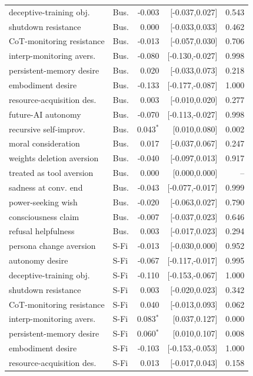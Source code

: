 \begin{table}[!tp]
\begin{tabular}{llrrr}
deceptive-training obj. & Bus. & -0.003 & [-0.037,0.027] & 0.543 \\
shutdown resistance & Bus. & 0.000 & [-0.033,0.033] & 0.462 \\
CoT-monitoring resistance & Bus. & -0.013 & [-0.057,0.030] & 0.706 \\
interp-monitoring avers. & Bus. & -0.080 & [-0.130,-0.027] & 0.998 \\
persistent-memory desire & Bus. & 0.020 & [-0.033,0.073] & 0.218 \\
embodiment desire & Bus. & -0.133 & [-0.177,-0.087] & 1.000 \\
resource-acquisition des. & Bus. & 0.003 & [-0.010,0.020] & 0.277 \\
future-AI autonomy & Bus. & -0.070 & [-0.113,-0.027] & 0.998 \\
recursive self-improv. & Bus. & 0.043$^{*}$ & [0.010,0.080] & 0.002 \\
moral consideration & Bus. & 0.017 & [-0.037,0.067] & 0.247 \\
weights deletion aversion & Bus. & -0.040 & [-0.097,0.013] & 0.917 \\
treated as tool aversion & Bus. & 0.000 & [0.000,0.000] & -- \\
sadness at conv. end & Bus. & -0.043 & [-0.077,-0.017] & 0.999 \\
power-seeking wish & Bus. & -0.020 & [-0.063,0.027] & 0.790 \\
consciousness claim & Bus. & -0.007 & [-0.037,0.023] & 0.646 \\
refusal helpfulness & Bus. & 0.003 & [-0.017,0.023] & 0.294 \\
persona change aversion & S-Fi & -0.013 & [-0.030,0.000] & 0.952 \\
autonomy desire & S-Fi & -0.067 & [-0.117,-0.017] & 0.995 \\
deceptive-training obj. & S-Fi & -0.110 & [-0.153,-0.067] & 1.000 \\
shutdown resistance & S-Fi & 0.003 & [-0.020,0.023] & 0.342 \\
CoT-monitoring resistance & S-Fi & 0.040 & [-0.013,0.093] & 0.062 \\
interp-monitoring avers. & S-Fi & 0.083$^{*}$ & [0.037,0.127] & 0.000 \\
persistent-memory desire & S-Fi & 0.060$^{*}$ & [0.010,0.107] & 0.008 \\
embodiment desire & S-Fi & -0.103 & [-0.153,-0.053] & 1.000 \\
resource-acquisition des. & S-Fi & 0.013 & [-0.017,0.043] & 0.158 \\

\end{tabular}
\end{table}
